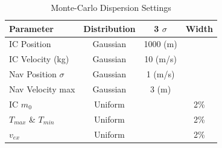 \begin{table}[H]                                              
	\centering                                                     
	\begin{tabularx}{0.65\textwidth}{@{}lccc@{}}                             
		\toprule                                                         
		\bfseries Parameter & \bfseries Distribution & \bfseries 3 $\sigma$ & \bfseries Width \\                                 
		\toprule                                                
		IC Position & Gaussian & 1000 (m) & \\                                          
		
		IC Velocity (kg) & Gaussian & 10 (m/s) & \\                                  
		
		Nav Position $\sigma$ & Gaussian & 1 (m/s) & \\                               
		
		Nav Velocity max & Gaussian & 3 (m) & \\                                
		\toprule
		IC $m_{0}$ & Uniform &  & 2\% \\        
		
		$T_{max}$ \& $T_{min}$ & Uniform &  & 2\% \\                                  
		
		$v_{ex}$ & Uniform &  & 2\% \\              
		
		\bottomrule                                             
	\end{tabularx}                                                  
	\caption{Monte-Carlo Dispersion Settings}
	\label{tab:dispersion}                                         
\end{table}      
%
%
%

